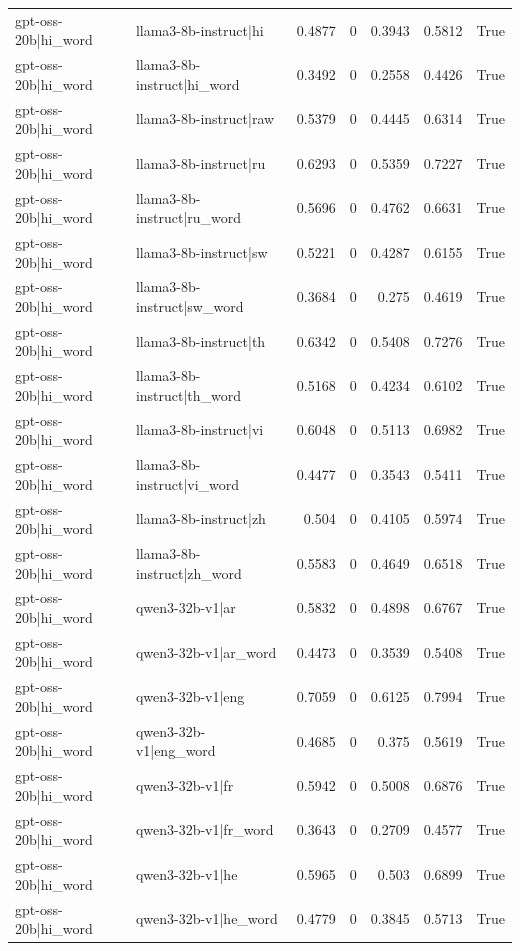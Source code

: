 \begin{table}
\begin{tabular}{l l r r r r l}
gpt-oss-20b|hi_word & llama3-8b-instruct|hi & 0.4877 & 0 & 0.3943 & 0.5812 & True \\
gpt-oss-20b|hi_word & llama3-8b-instruct|hi_word & 0.3492 & 0 & 0.2558 & 0.4426 & True \\
gpt-oss-20b|hi_word & llama3-8b-instruct|raw & 0.5379 & 0 & 0.4445 & 0.6314 & True \\
gpt-oss-20b|hi_word & llama3-8b-instruct|ru & 0.6293 & 0 & 0.5359 & 0.7227 & True \\
gpt-oss-20b|hi_word & llama3-8b-instruct|ru_word & 0.5696 & 0 & 0.4762 & 0.6631 & True \\
gpt-oss-20b|hi_word & llama3-8b-instruct|sw & 0.5221 & 0 & 0.4287 & 0.6155 & True \\
gpt-oss-20b|hi_word & llama3-8b-instruct|sw_word & 0.3684 & 0 & 0.275 & 0.4619 & True \\
gpt-oss-20b|hi_word & llama3-8b-instruct|th & 0.6342 & 0 & 0.5408 & 0.7276 & True \\
gpt-oss-20b|hi_word & llama3-8b-instruct|th_word & 0.5168 & 0 & 0.4234 & 0.6102 & True \\
gpt-oss-20b|hi_word & llama3-8b-instruct|vi & 0.6048 & 0 & 0.5113 & 0.6982 & True \\
gpt-oss-20b|hi_word & llama3-8b-instruct|vi_word & 0.4477 & 0 & 0.3543 & 0.5411 & True \\
gpt-oss-20b|hi_word & llama3-8b-instruct|zh & 0.504 & 0 & 0.4105 & 0.5974 & True \\
gpt-oss-20b|hi_word & llama3-8b-instruct|zh_word & 0.5583 & 0 & 0.4649 & 0.6518 & True \\
gpt-oss-20b|hi_word & qwen3-32b-v1|ar & 0.5832 & 0 & 0.4898 & 0.6767 & True \\
gpt-oss-20b|hi_word & qwen3-32b-v1|ar_word & 0.4473 & 0 & 0.3539 & 0.5408 & True \\
gpt-oss-20b|hi_word & qwen3-32b-v1|eng & 0.7059 & 0 & 0.6125 & 0.7994 & True \\
gpt-oss-20b|hi_word & qwen3-32b-v1|eng_word & 0.4685 & 0 & 0.375 & 0.5619 & True \\
gpt-oss-20b|hi_word & qwen3-32b-v1|fr & 0.5942 & 0 & 0.5008 & 0.6876 & True \\
gpt-oss-20b|hi_word & qwen3-32b-v1|fr_word & 0.3643 & 0 & 0.2709 & 0.4577 & True \\
gpt-oss-20b|hi_word & qwen3-32b-v1|he & 0.5965 & 0 & 0.503 & 0.6899 & True \\
gpt-oss-20b|hi_word & qwen3-32b-v1|he_word & 0.4779 & 0 & 0.3845 & 0.5713 & True \\

\end{tabular}
\end{table}
